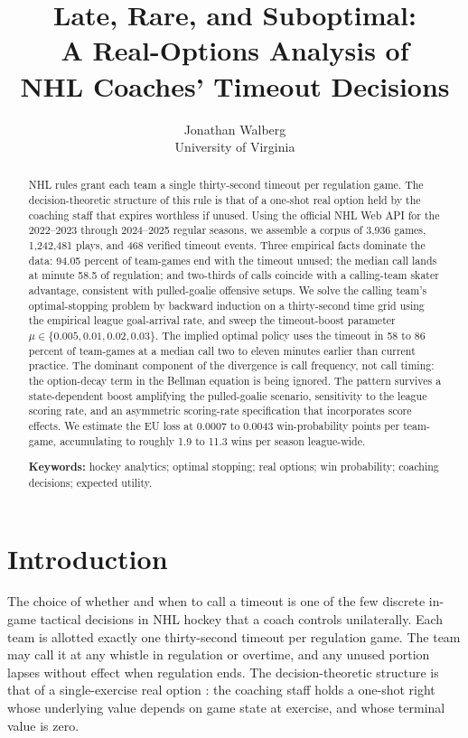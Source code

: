 \documentclass[11pt]{article}
\title{Late, Rare, and Suboptimal:\\
A Real-Options Analysis of\\
NHL Coaches' Timeout Decisions}
\author{Jonathan Walberg\\University of Virginia}
\date{}
\begin{document}
\maketitle
\thispagestyle{empty}

\begin{abstract}
\noindent NHL rules grant each team a single thirty-second timeout per regulation game. The decision-theoretic structure of this rule is that of a one-shot real option held by the coaching staff that expires worthless if unused. Using the official NHL Web API for the 2022--2023 through 2024--2025 regular seasons, we assemble a corpus of 3{,}936 games, 1{,}242{,}481 plays, and 468 verified timeout events. Three empirical facts dominate the data: 94.05 percent of team-games end with the timeout unused; the median call lands at minute 58.5 of regulation; and two-thirds of calls coincide with a calling-team skater advantage, consistent with pulled-goalie offensive setups. We solve the calling team's optimal-stopping problem by backward induction on a thirty-second time grid using the empirical league goal-arrival rate, and sweep the timeout-boost parameter $\mu \in \{0.005, 0.01, 0.02, 0.03\}$. The implied optimal policy uses the timeout in 58 to 86 percent of team-games at a median call two to eleven minutes earlier than current practice. The dominant component of the divergence is call frequency, not call timing: the option-decay term in the Bellman equation is being ignored. The pattern survives a state-dependent boost amplifying the pulled-goalie scenario, sensitivity to the league scoring rate, and an asymmetric scoring-rate specification that incorporates score effects. We estimate the EU loss at 0.0007 to 0.0043 win-probability points per team-game, accumulating to roughly 1.9 to 11.3 wins per season league-wide.

\noindent\textbf{Keywords:} hockey analytics; optimal stopping; real options; win probability; coaching decisions; expected utility.
\end{abstract}

\onehalfspacing

\section{Introduction}

The choice of whether and when to call a timeout is one of the few discrete in-game tactical decisions in NHL hockey that a coach controls unilaterally. Each team is allotted exactly one thirty-second timeout per regulation game. The team may call it at any whistle in regulation or overtime, and any unused portion lapses without effect when regulation ends. The decision-theoretic structure is that of a single-exercise real option \citep{DixitPindyck1994}: the coaching staff holds a one-shot right whose underlying value depends on game state at exercise, and whose terminal value is zero.
\end{document}
